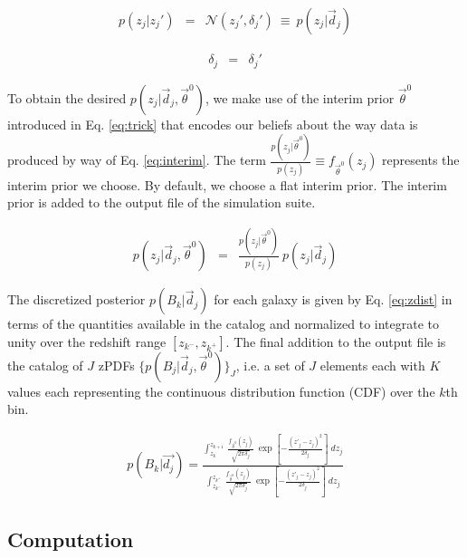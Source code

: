 \documentclass[preprint]{aastex}
\begin{document}
\begin{eqnarray}
\label{eq:zspread}
p(z_{j}|z_{j}') &=& \mathcal{N}(z_{j}',\delta_{j}')\ \equiv\ p(z_{j}|\vec{d}_{j})
\end{eqnarray}

\begin{eqnarray}
\label{eq:delta-spread}
\delta_{j} &=& \delta_{j}'
\end{eqnarray}

To obtain the desired $p(z_{j}|\vec{d}_{j},\vec{\theta}^{0})$, we make use of the interim prior $\vec{\theta}^{0}$ introduced in Eq. \ref{eq:trick} that encodes our beliefs about the way data is produced by way of Eq. \ref{eq:interim}.  The term $\frac{p(z_{j}|\vec{\theta}^{0})}{p(z_{j})}\equiv f_{\vec{\theta}^{0}}(z_{j})$ represents the interim prior we choose.  By default, we choose a flat interim prior.  The interim prior is added to the output file of the simulation suite.  

\begin{eqnarray}
\label{eq:interim}
p(z_{j}|\vec{d}_{j},\vec{\theta}^{0}) &=& \frac{p(z_{j}|\vec{\theta}^{0})}{p(z_{j})}\ p(z_{j}|\vec{d}_{j})
\end{eqnarray}

The discretized posterior $p(B_{k}|\vec{d}_{j})$ for each galaxy is given by Eq. \ref{eq:zdist} in terms of the quantities available in the catalog and normalized to integrate to unity over the redshift range $[z_{k^{-}},z_{k^{+}}]$.  The final addition to the output file is the catalog of $J$ zPDFs $\{p(B_{j}|\vec{d}_{j},\vec{\theta}^{0})\}_{J}$, i.e. a set of $J$ elements each with $K$ values each representing the continuous distribution function (CDF) over the $k$th bin.

\begin{eqnarray}
\label{eq:zdist}
p(B_{k}|\vec{d_{j}}) = \frac{\int_{z_{k}}^{z_{k+1}}\ \frac{f_{\vec{\theta}^{0}}(z_{j})}{\sqrt{2\pi\delta_{j}}}\ \exp\left[-\frac{(z'_{j}-z_{j})^{2}}{2\delta_{j}}\right]\ dz_{j}}{\int_{z_{k^{-}}}^{z_{k^{+}}}\ \frac{f_{\vec{\theta}^{0}}(z_{j})}{\sqrt{2\pi\delta_{j}}}\ \exp\left[-\frac{(z'_{j}-z_{j})^{2}}{2\delta_{j}}\right]\ dz_{j}}
\end{eqnarray}

\clearpage
\subsection{Computation}
\label{sec:mcmc}
\end{document}
